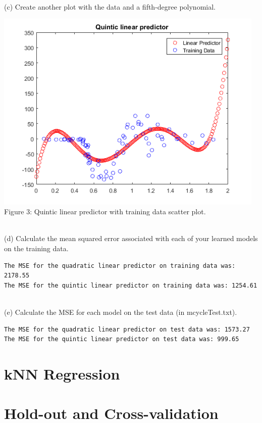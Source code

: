 \documentclass[]{report}   %
\begin{document}
~\\ 
(c) Create another plot with the data and a fifth-degree polynomial.
\begin{center}
	\includegraphics[width=35em]{2_1_Figure_3.png}
	{Figure 3: Quintic linear predictor with training data scatter plot.}
\end{center}
~\\
(d) Calculate the mean squared error associated with each of your learned models on the training
data.
\begin{lstlisting}[caption=Matlab output for MSE calculations on training data.]
The MSE for the quadratic linear predictor on training data was: 2178.55
The MSE for the quintic linear predictor on training data was: 1254.61
\end{lstlisting}
~\\
(e) Calculate the MSE for each model on the test data (in mcycleTest.txt).
\begin{lstlisting}[caption=Matlab output for MSE calculations on test data.]
The MSE for the quadratic linear predictor on test data was: 1573.27
The MSE for the quintic linear predictor on test data was: 999.65
\end{lstlisting}





\section{kNN Regression}
\section{Hold-out and Cross-validation}
\end{document}
